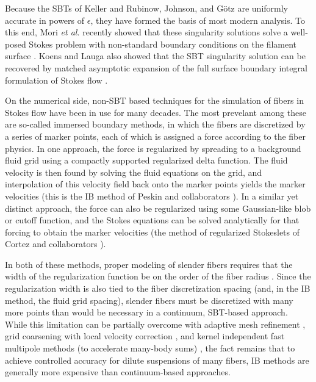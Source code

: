 Because the SBTs of Keller and Rubinow, Johnson, and G\"otz are uniformly accurate in powers of $\epsilon$, they have formed the basis of most modern analysis. To this end, Mori \textit{et al.} recently showed that these singularity solutions solve a well-posed Stokes problem with non-standard boundary conditions on the filament surface \cite{mori2018theoretical, morifree}. Koens and Lauga also showed that the SBT singularity solution can be recovered by matched asymptotic expansion of the full surface boundary integral formulation of Stokes flow \cite{koens2018boundary}. 

On the numerical side, non-SBT based techniques for the simulation of fibers in Stokes flow have been in use for many decades. The most prevelant among these are so-called immersed boundary methods, in which the fibers are discretized by a series of marker points, each of which is assigned a force according to the fiber physics. In one approach, the force is regularized by spreading to a background fluid grid using a compactly supported regularized delta function. The fluid velocity is then found by solving the fluid equations on the grid, and interpolation of this velocity field back onto the marker points yields the marker velocities (this is the IB method of Peskin and collaborators \cite{peskin1972flow, peskin2002acta}). In a similar yet distinct approach, the force can also be regularized using some Gaussian-like blob or cutoff function, and the Stokes equations can be solved analytically for that forcing to obtain the marker velocities (the method of regularized Stokeslets of Cortez and collaborators \cite{cortez2001method, cortez2005method}). 

In both of these methods, proper modeling of slender fibers requires that the width of the regularization function be on the order of the fiber radius \cite{ttbring08}. Since the regularization width is also tied to the fiber discretization spacing (and, in the IB method, the fluid grid spacing), slender fibers must be discretized with many more points than would be necessary in a continuum, SBT-based approach. While this limitation can be partially overcome with adaptive mesh refinement \cite{griffith2007adaptive}, grid coarsening with local velocity correction \cite{maxian19}, and kernel independent fast multipole methods (to accelerate many-body sums) \cite{rostami2016kernel}, the fact remains that to achieve controlled accuracy for dilute suspensions of many fibers, IB methods are generally more expensive than continuum-based approaches. 

